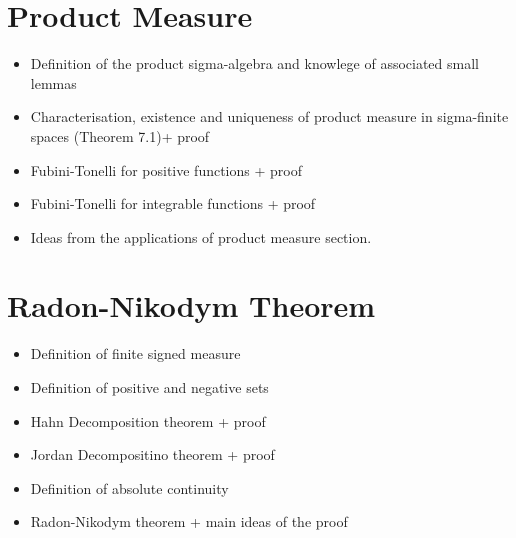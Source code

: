 \documentclass[
]{book}
\providecommand{\tightlist}{%
  \setlength{\itemsep}{0pt}\setlength{\parskip}{0pt}}
\theoremstyle{definition}
\theoremstyle{definition}
\theoremstyle{definition}
\theoremstyle{definition}
\theoremstyle{remark}
\begin{document}
\hypertarget{product-measure}{%
\section{Product Measure}\label{product-measure}}

\begin{itemize}
\tightlist
\item
  Definition of the product sigma-algebra and knowlege of associated small lemmas
\item
  Characterisation, existence and uniqueness of product measure in sigma-finite spaces (Theorem 7.1)+ proof
\item
  Fubini-Tonelli for positive functions + proof
\item
  Fubini-Tonelli for integrable functions + proof
\item
  Ideas from the applications of product measure section.
\end{itemize}

\hypertarget{radon-nikodym-theorem-1}{%
\section{Radon-Nikodym Theorem}\label{radon-nikodym-theorem-1}}

\begin{itemize}
\tightlist
\item
  Definition of finite signed measure
\item
  Definition of positive and negative sets
\item
  Hahn Decomposition theorem + proof
\item
  Jordan Decompositino theorem + proof
\item
  Definition of absolute continuity
\item
  Radon-Nikodym theorem + main ideas of the proof
\end{itemize}

  
\end{document}
